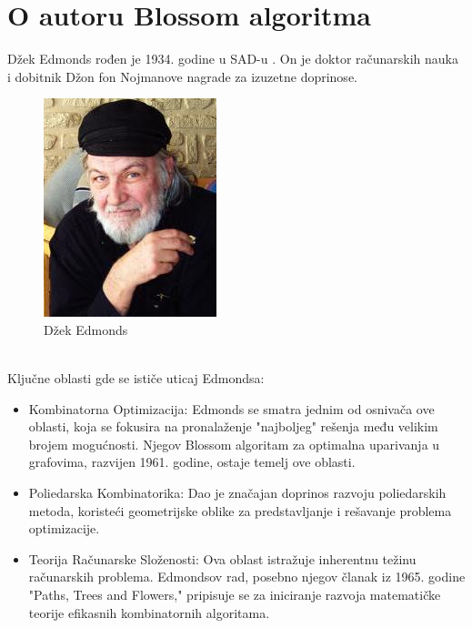 \documentclass[11pt,a4paper]{article}
\theoremstyle{definition}
\begin{document}
\section{O autoru Blossom algoritma}
Džek Edmonds rođen je 1934. godine u SAD-u \cite{sajt4}. On je doktor računarskih nauka i dobitnik Džon fon Nojmanove nagrade za izuzetne doprinose.
\begin{figure}[ht]
\begin{center}
\includegraphics[scale=0.4]{jack_edmonds.jpg}
\end{center}
\caption{Džek Edmonds}
\label{fig:slika 6}
\end{figure}
\\Ključne oblasti gde se ističe uticaj Edmondsa:
\begin{itemize}
\item Kombinatorna Optimizacija: Edmonds se smatra jednim od osnivača ove oblasti, koja se fokusira na pronalaženje "najboljeg" rešenja među velikim brojem mogućnosti. Njegov Blossom algoritam za optimalna uparivanja u grafovima, razvijen 1961. godine, ostaje temelj ove oblasti.

\item Poliedarska Kombinatorika: Dao je značajan doprinos razvoju poliedarskih metoda, koristeći geometrijske oblike za predstavljanje i rešavanje problema optimizacije.

\item  Teorija Računarske Složenosti: Ova oblast istražuje inherentnu težinu računarskih problema. Edmondsov rad, posebno njegov članak iz 1965. godine "Paths, Trees and Flowers," pripisuje se za iniciranje razvoja matematičke teorije efikasnih kombinatornih algoritama.
\end{itemize}
\end{document}
